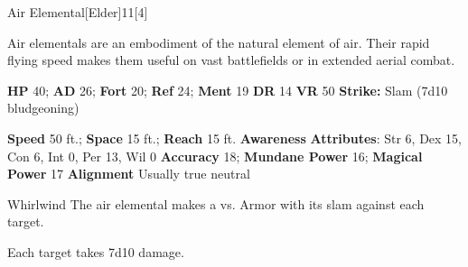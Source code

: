   \begin{monsection}{Air Elemental}[Elder]{11}[4]
    \vspace{-1em}\vspace{-1em}
    \vspace{0em}

    
    Air elementals are an embodiment of the natural element of air.
    Their rapid flying speed makes them useful on vast battlefields or in extended aerial combat.
  
    

    \begin{spellcontent}
      \begin{spelltargetinginfo}
        \pari \textbf{HP} 40;
          \textbf{AD} 26;
          \textbf{Fort} 20;
          \textbf{Ref} 24;
          \textbf{Ment} 19
        \pari \textbf{DR} 14
        \pari \textbf{VR} 50
        \pari \textbf{Strike:}
            Slam  (7d10 bludgeoning)
      \end{spelltargetinginfo}
    \end{spellcontent}
    \begin{monsterfooter}
      \pari \textbf{Speed} 50 ft.;
        \textbf{Space} 15 ft.;
        \textbf{Reach} 15 ft.
      \pari \textbf{Awareness} 
      \pari \textbf{Attributes}:
        Str 6, Dex 15,
        Con 6, Int 0,
        Per 13, Wil 0
      \pari \textbf{Accuracy} 18;
        \textbf{Mundane Power} 16;
      \textbf{Magical Power} 17
      \pari \textbf{Alignment} Usually true neutral
    \end{monsterfooter}
  \end{monsection}
  \begin{freeability}{Whirlwind}
       The air elemental makes a 
         vs. Armor
        with its slam against each target.
    
    \hit Each target takes 7d10  damage.
    \end{freeability}
  

